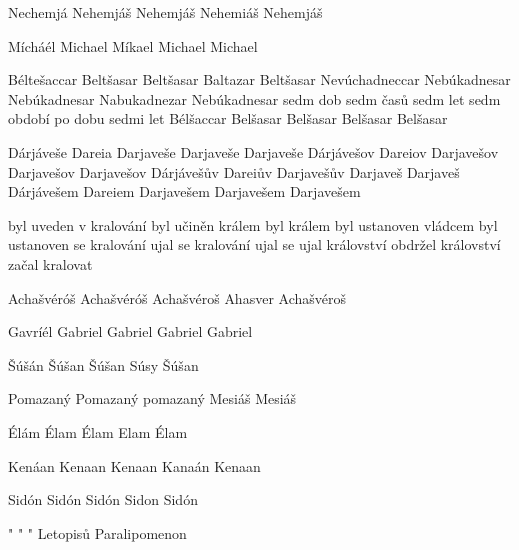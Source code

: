        {Nechemjá} %
       {Nehemjáš} %
       {Nehemjáš} %
       {Nehemiáš} %
       {Nehemjáš} %

       {Mícháél} %
       {Michael} %
       {Míkael} %
       {Michael} %
       {Michael} %





       {Béltešaccar}  {Beltšasar}    {Beltšasar}    {Baltazar} {Beltšasar}
 {Nevúchadneccar}  {Nebúkadnesar} {Nebúkadnesar} {Nabukadnezar} {Nebúkadnesar}
 {sedm dob} {sedm časů} {sedm let} {sedm období} {po dobu sedmi let}
  {Bélšaccar} {Belšasar}   {Belšasar}  {Belšasar}  {Belšasar}

   {Dárjáveše}  {Dareia}  {Darjaveše}  {Darjaveše}  {Darjaveše}
  {Dárjávešov} {Dareiov} {Darjavešov} {Darjavešov} {Darjavešov}
 {Dárjávešův} {Dareiův} {Darjavešův} {Darjaveš} {Darjaveš}
 {Dárjávešem} {Dareiem} {Darjavešem} {Darjavešem} {Darjavešem}

        {byl uveden v kralování} 
        {byl učiněn králem} 
        {byl králem} 
        {byl ustanoven vládcem} 
        {byl ustanoven}
      {se kralování ujal}
      {se kralování ujal}
      {se ujal království}
      {obdržel království}
      {začal kralovat}
    



 {Achašvéróš} {Achašvéróš} {Achašvéroš} {Ahasver} {Achašvéroš}

 {Gavríél} {Gabriel} {Gabriel} {Gabriel} {Gabriel}


 {Šúšán} {Šúšan} {Šúšan} {Súsy} {Šúšan} %

 {Pomazaný} {Pomazaný} {pomazaný} {Mesiáš} {Mesiáš}

  {Élám} {Élam}  {Élam} {Elam} {Élam} 

        {Kenáan}  %
        {Kenaan}  %
        {Kenaan}  %
        {Kanaán}  %
        {Kenaan}  %

 {Sidón} {Sidón} {Sidón} {Sidon} {Sidón}

 {"} {"} {"} {Letopisů} {Paralipomenon}




